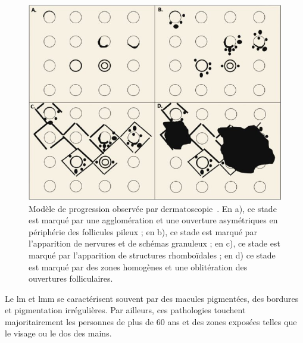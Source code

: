 \begin{figure}[H]
    \centering
    \includegraphics[width=0.8\linewidth]{contents/chapter_1/resources/illustration_surface_progression.jpg}
    \caption{Modèle de progression observée par dermatoscopie~\cite{Navarrete-Dechent2020}. En a), ce stade est marqué par une agglomération et une ouverture asymétriques en périphérie des follicules pileux ; en b), ce stade est marqué par l'apparition de nervures et de schémas granuleux ; en c), ce stade est marqué par l'apparition de structures rhomboïdales ; en d) ce stade est marqué par des zones homogènes et une oblitération des ouvertures folliculaires.}
    \label{fig:illustration_surface_progression}
\end{figure}\par

Le \gls{lm} et \gls{lmm} se caractérisent souvent par des macules pigmentées, des bordures et pigmentation irrégulières. Par ailleurs, ces pathologies touchent majoritairement les personnes de plus de 60 ans et des zones exposées telles que le visage ou le dos des mains.\par

